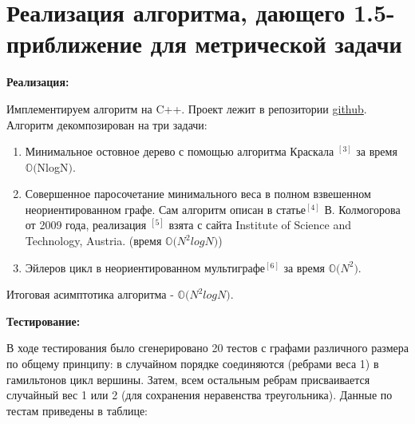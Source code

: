 \documentclass[14pt]{article}
\begin{document}
	
	
	\section{Реализация алгоритма, дающего 1.5-приближение для метрической задачи}
	
	\begin{center}
		\textbf{\large Реализация:}
	\end{center}
	
	Имплементируем алгоритм на C++. Проект лежит в репозитории \href{https://github.com/JerryCh0/complexity/tree/master/Christofides/Christofides}{github}.
	Алгоритм декомпозирован на три задачи:
	\begin{enumerate}
		\item Минимальное остовное дерево с помощью алгоритма Краскала \hyperref[Kruskal]{$^{[3]}$} за время $\mathbb{O(}$NlogN$)$. 
		\item Совершенное паросочетание минимального веса в полном взвешенном неориентированном графе. Сам алгоритм описан в статье\hyperref[kolm]{$^{[4]}$} В. Колмогорова от 2009 года, реализация \hyperref[realisation]{$^{[5]}$} взята с сайта Institute of Science and Technology, Austria. (время $\mathbb{O(}N^2logN)$)
		\item Эйлеров цикл в неориентированном мультиграфе\hyperref[euler]{$^{[6]}$} за время $\mathbb{O(}N^2)$.
	\end{enumerate}
	
	Итоговая асимптотика алгоритма - $\mathbb{O(}N^2logN)$.
	
	\begin{center}
		\textbf{\large Тестирование:}
	\end{center} 
	
	В ходе тестирования было сгенерировано 20 тестов с графами различного размера по общему принципу: в случайном порядке соединяются (ребрами веса 1) в гамильтонов цикл вершины. Затем, всем остальным ребрам присваивается случайный вес 1 или 2 (для сохранения неравенства треугольника). Данные по тестам приведены в таблице:
	
	$                  $
	
\end{document}
